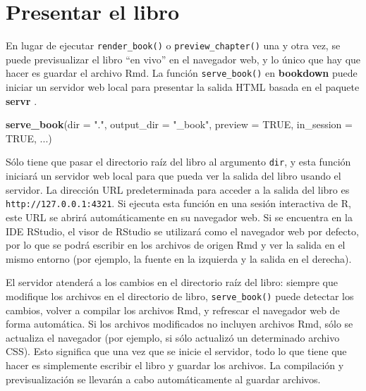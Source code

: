 \documentclass[12pt,]{krantz}
\makeatletter
\newenvironment{Shaded}{\begin{snugshade}}{\end{snugshade}}
\newcommand{\KeywordTok}[1]{\textcolor[rgb]{0.13,0.29,0.53}{\textbf{#1}}}
\newcommand{\DataTypeTok}[1]{\textcolor[rgb]{0.13,0.29,0.53}{#1}}
\newcommand{\StringTok}[1]{\textcolor[rgb]{0.31,0.60,0.02}{#1}}
\newcommand{\OtherTok}[1]{\textcolor[rgb]{0.56,0.35,0.01}{#1}}
\newcommand{\NormalTok}[1]{#1}
\newenvironment{kframe}{%
\medskip{}
\setlength{\fboxsep}{.8em}
 \def\at@end@of@kframe{}%
 \ifinner\ifhmode%
  \def\at@end@of@kframe{\end{minipage}}%
  \begin{minipage}{\columnwidth}%
 \fi\fi%
 \def\FrameCommand##1{\hskip\@totalleftmargin \hskip-\fboxsep
 \colorbox{shadecolor}{##1}\hskip-\fboxsep
     \hskip-\linewidth \hskip-\@totalleftmargin \hskip\columnwidth}%
 \MakeFramed {\advance\hsize-\width
   \@totalleftmargin\z@ \linewidth\hsize
   \@setminipage}}%
 {\par\unskip\endMakeFramed%
 \at@end@of@kframe}
\renewenvironment{Shaded}{\begin{kframe}}{\end{kframe}}
\theoremstyle{definition}
\theoremstyle{definition}
\theoremstyle{definition}
\theoremstyle{remark}
\makeatother
\begin{document}
\section{Presentar el libro}\label{presentar-el-libro}

En lugar de ejecutar \texttt{render\_book()} o
\texttt{preview\_chapter()} una y otra vez, se puede previsualizar el
libro ``en vivo'' en el navegador web, y lo único que hay que hacer es
guardar el archivo Rmd. La función \texttt{serve\_book()} en
\textbf{bookdown} puede iniciar un servidor web local para presentar la
salida HTML basada en el paquete \textbf{servr} \citep{R-servr}.

\begin{Shaded}
\begin{Highlighting}[]
\KeywordTok{serve_book}\NormalTok{(}\DataTypeTok{dir =} \StringTok{"."}\NormalTok{, }\DataTypeTok{output_dir =} \StringTok{"_book"}\NormalTok{,}
  \DataTypeTok{preview =} \OtherTok{TRUE}\NormalTok{, }\DataTypeTok{in_session =} \OtherTok{TRUE}\NormalTok{, ...)}
\end{Highlighting}
\end{Shaded}

Sólo tiene que pasar el directorio raíz del libro al argumento
\texttt{dir}, y esta función iniciará un servidor web local para que
pueda ver la salida del libro usando el servidor. La dirección URL
predeterminada para acceder a la salida del libro es
\texttt{http://127.0.0.1:4321}. Si ejecuta esta función en una sesión
interactiva de R, este URL se abrirá automáticamente en su navegador
web. Si se encuentra en la IDE RStudio, el visor de RStudio se utilizará
como el navegador web por defecto, por lo que se podrá escribir en los
archivos de origen Rmd y ver la salida en el mismo entorno (por ejemplo,
la fuente en la izquierda y la salida en el derecha).

El servidor atenderá a los cambios en el directorio raíz del libro:
siempre que modifique los archivos en el directorio de libro,
\texttt{serve\_book()} puede detectar los cambios, volver a compilar los
archivos Rmd, y refrescar el navegador web de forma automática. Si los
archivos modificados no incluyen archivos Rmd, sólo se actualiza el
navegador (por ejemplo, si sólo actualizó un determinado archivo CSS).
Esto significa que una vez que se inicie el servidor, todo lo que tiene
que hacer es simplemente escribir el libro y guardar los archivos. La
compilación y previsualización se llevarán a cabo automáticamente al
guardar archivos.
\end{document}
